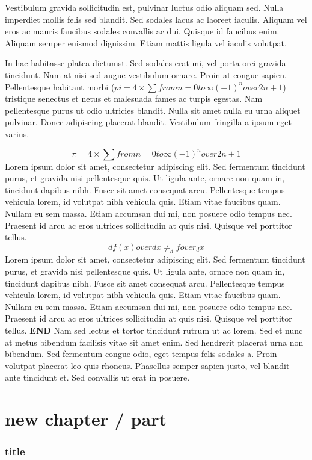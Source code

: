 Vestibulum gravida sollicitudin est, pulvinar luctus odio aliquam sed. Nulla imperdiet mollis felis sed blandit. Sed sodales lacus ac laoreet iaculis. Aliquam vel eros ac mauris faucibus sodales convallis ac dui. Quisque id faucibus enim. Aliquam semper euismod dignissim. Etiam mattis ligula vel iaculis volutpat.

In hac habitasse platea dictumst. Sed sodales erat mi, vel porta orci gravida tincidunt. Nam at nisi sed augue vestibulum ornare. Proin at congue sapien. Pellentesque habitant morbi ($pi = 4 \times \sum from n=0 to \infty (-1)^n over 2n+1$) tristique senectus et netus et malesuada fames ac turpis egestas. Nam pellentesque purus ut odio ultricies blandit. Nulla sit amet nulla eu urna aliquet pulvinar. Donec adipiscing placerat blandit. Vestibulum fringilla a ipsum eget varius.

\[
    \pi = 4 \times \sum from n=0 to \infty (-1)^n over 2n+1
\]
Lorem ipsum dolor sit amet, consectetur adipiscing elit. Sed fermentum tincidunt purus, et gravida nisi pellentesque quis. Ut ligula ante, ornare non quam in, tincidunt dapibus nibh. Fusce sit amet consequat arcu. Pellentesque tempus vehicula lorem, id volutpat nibh vehicula quis. Etiam vitae faucibus quam. Nullam eu sem massa. Etiam accumsan dui mi, non posuere odio tempus nec. Praesent id arcu ac eros ultrices sollicitudin at quis nisi. Quisque vel porttitor tellus.
\[
    d f(x) over d x \neq _d f over _d x
\]
Lorem ipsum dolor sit amet, consectetur adipiscing elit. Sed fermentum tincidunt purus, et gravida nisi pellentesque quis. Ut ligula ante, ornare non quam in, tincidunt dapibus nibh. Fusce sit amet consequat arcu. Pellentesque tempus vehicula lorem, id volutpat nibh vehicula quis. Etiam vitae faucibus quam. Nullam eu sem massa. Etiam accumsan dui mi, non posuere odio tempus nec. Praesent id arcu ac eros ultrices sollicitudin at quis nisi. Quisque vel porttitor tellus. \textbf{END}
Nam sed lectus et tortor tincidunt rutrum ut ac lorem. Sed et nunc at metus bibendum facilisis vitae sit amet enim. Sed hendrerit placerat urna non bibendum. Sed fermentum congue odio, eget tempus felis sodales a. Proin volutpat placerat leo quis rhoncus. Phasellus semper sapien justo, vel blandit ante tincidunt et. Sed convallis ut erat in posuere.

\part{new chapter / part}


\section{title}

